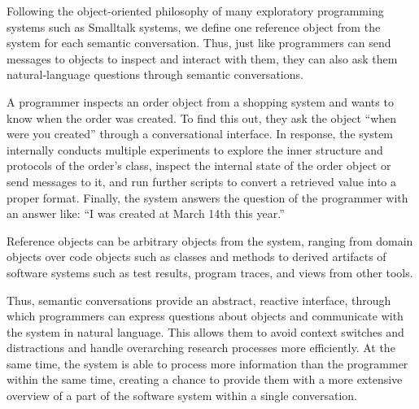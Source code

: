 Following the object-oriented philosophy of many exploratory programming systems such as Smalltalk systems, we define one reference object from the system for each semantic conversation.
Thus, just like programmers can send messages to objects to inspect and interact with them, they can also ask them natural-language questions through semantic conversations.

\begin{example}
	A programmer inspects an order object from a shopping system and wants to know when the order was created.
	To find this out, they ask the object ``when were you created'' through a conversational interface.
	In response, the system internally conducts multiple experiments to explore the inner structure and protocols of the order's class, inspect the internal state of the order object or send messages to it, and run further scripts to convert a retrieved value into a proper format.
	Finally, the system answers the question of the programmer with an answer like: ``I was created at March 14th this year.''
\end{example}

Reference objects can be arbitrary objects from the system, ranging from domain objects over code objects such as classes and methods to derived artifacts of software systems such as test results, program traces, and views from other tools.

Thus, semantic conversations provide an abstract, reactive interface, through which programmers can express questions about objects and communicate with the system in natural language.
This allows them to avoid context switches and distractions and handle overarching research processes more efficiently.
At the same time, the system is able to process more information than the programmer within the same time, creating a chance to provide them with a more extensive overview of a part of the software system within a single conversation.

